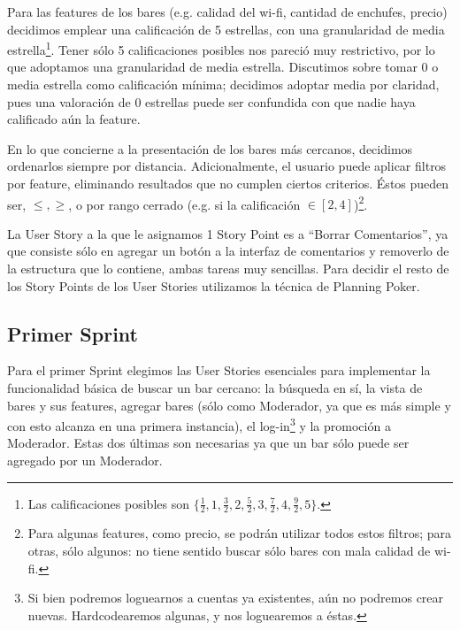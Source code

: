 \par Para las features de los bares (e.g. calidad del wi-fi, cantidad de enchufes, precio) decidimos emplear una calificación de 5 estrellas, con una granularidad de media estrella\footnote{Las calificaciones posibles son $\{ \frac{1}{2}, 1, \frac{3}{2}, 2, \frac{5}{2}, 3, \frac{7}{2}, 4, \frac{9}{2}, 5 \}$.}.
Tener sólo 5 calificaciones posibles nos pareció muy restrictivo, por lo que adoptamos una granularidad de media estrella.
Discutimos sobre tomar 0 o media estrella como calificación mínima; decidimos adoptar media por claridad, pues una valoración de 0 estrellas puede ser confundida con que nadie haya calificado aún la feature.

\par En lo que concierne a la presentación de los bares más cercanos, decidimos ordenarlos siempre por distancia.
Adicionalmente, el usuario puede aplicar filtros por feature, eliminando resultados que no cumplen ciertos criterios. 
Éstos pueden ser, $\leqslant, \geqslant$, o por rango cerrado (e.g. si la calificación $\in [2, 4]$)\footnote{Para algunas features, como precio, se podrán utilizar todos estos filtros; para otras, sólo algunos: no tiene sentido buscar sólo bares con mala calidad de wi-fi.}.

\par La User Story a la que le asignamos 1 Story Point es a ``Borrar Comentarios'', ya que consiste sólo en agregar un botón a la interfaz de comentarios y removerlo de la estructura que lo contiene, ambas tareas muy sencillas. Para decidir el resto de los Story Points de los User Stories utilizamos la técnica de Planning Poker.

\subsection{Primer Sprint}
\par Para el primer Sprint elegimos las User Stories esenciales para implementar la funcionalidad básica de buscar un bar cercano: la búsqueda en sí, la vista de bares y sus features, agregar bares (sólo como Moderador, ya que es más simple y con esto alcanza en una primera instancia), el log-in\footnote{Si bien podremos loguearnos a cuentas ya existentes, aún no podremos crear nuevas. Hardcodearemos algunas, y nos loguearemos a éstas.} y la promoción a Moderador.
Estas dos últimas son necesarias ya que un bar sólo puede ser agregado por un Moderador.

